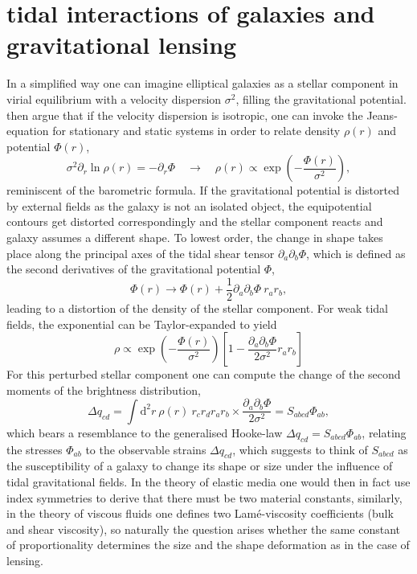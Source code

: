 \documentclass[a4paper,fleqn,usenatbib]{mnras}
\newcommand{\dd}{\mathrm{d}}
\begin{document}
\section{tidal interactions of galaxies and gravitational lensing}\label{sect_tidal}
In a simplified way one can imagine elliptical galaxies as a stellar component in virial equilibrium with a velocity dispersion $\sigma^2$, filling the gravitational potential. \citet{piras_mass_2018} then argue that if the velocity dispersion is isotropic, one can invoke the Jeans-equation for stationary and static systems in order to relate density $\rho(r)$ and potential $\Phi(r)$,
\begin{equation}
\sigma^2\partial_r\ln\rho(r) = -\partial_r\Phi
\quad\rightarrow\quad
\rho(r) \propto \exp\left(-\frac{\Phi(r)}{\sigma^2}\right),
\end{equation}
reminiscent of the barometric formula. If the gravitational potential is distorted by external fields as the galaxy is not an isolated object, the equipotential contours get distorted correspondingly and the stellar component reacts and galaxy assumes a different shape. To lowest order, the change in shape takes place along the principal axes of the tidal shear tensor $\partial_a\partial_b\Phi$, which is defined as the second derivatives of the gravitational potential $\Phi$,
\begin{equation}
\Phi(r) \rightarrow \Phi(r) + \frac{1}{2}\partial_a\partial_b\Phi\:r_a r_b,
\end{equation}
leading to a distortion of the density of the stellar component. For weak tidal fields, the exponential can be Taylor-expanded to yield
\begin{equation}
\rho \propto 
\exp\left(-\frac{\Phi(r)}{\sigma^2}\right)\left[1-\frac{\partial_a\partial_b\Phi}{2\sigma^2}r_a r_b\right]
\end{equation}
For this perturbed stellar component one can compute the change of the second moments of the brightness distribution,
\begin{equation}
\Delta q_{cd} = 
\int\dd^2r\:\rho(r)\: r_c r_d r_a r_b\times\frac{\partial_a\partial_b\Phi}{2\sigma^2} = S_{abcd}\Phi_{ab},
\end{equation}
which bears a resemblance to the generalised Hooke-law $\Delta q_{cd} = S_{abcd}\Phi_{ab}$, relating the stresses $\Phi_{ab}$ to the observable strains $\Delta q_{cd}$, which suggests to think of $S_{abcd}$ as the susceptibility of a galaxy to change its shape or size under the influence of tidal gravitational fields. In the theory of elastic media one would then in fact use index symmetries to derive that there must be two material constants, similarly, in the theory of viscous fluids one defines two Lam{\'e}-viscosity coefficients (bulk and shear viscosity), so naturally the question arises whether the same constant of proportionality determines the size and the shape deformation as in the case of lensing.
\end{document}
